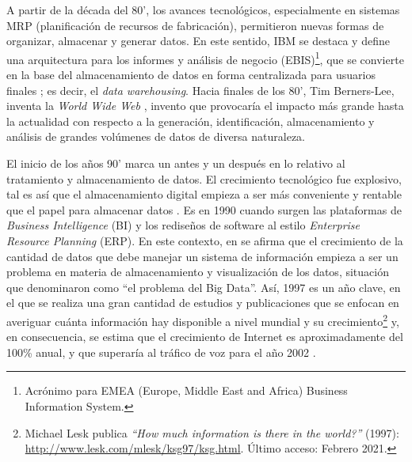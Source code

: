 \bigskip A partir de la década del 80’, los avances tecnológicos, especialmente en sistemas MRP (planificación de recursos de fabricación), permitieron nuevas formas de organizar, almacenar y generar datos. En este sentido, IBM se destaca y define una arquitectura para los informes y análisis de negocio (EBIS)\footnote{Acrónimo para EMEA (Europe, Middle East and Africa) Business Information System.}, que se convierte en la base del almacenamiento de datos en forma centralizada para usuarios finales \citep{devlin1988architecture}; es decir, el \textit{data warehousing}. Hacia finales de los 80’, Tim Berners-Lee, inventa la \textit{World Wide Web} \citep{berners1992world}, invento que provocaría el impacto más grande hasta la actualidad con respecto a la generación, identificación, almacenamiento y análisis de grandes volúmenes de datos de diversa naturaleza.

\bigskip El inicio de los años 90’ marca un antes y un después en lo relativo al tratamiento y almacenamiento de datos. El crecimiento tecnológico fue explosivo, tal es así que el almacenamiento digital empieza a ser más conveniente y rentable que el papel para almacenar datos \citep{morris2003evolution}. Es en 1990 cuando surgen las plataformas de \textit{Business Intelligence} (BI) y los rediseños de software al estilo \textit{Enterprise Resource Planning} (ERP). En este contexto, en \citep{cox1997application} se afirma que el crecimiento de la cantidad de datos que debe manejar un sistema de información empieza a ser un problema en materia de almacenamiento y visualización de los datos, situación que denominaron como “el problema del Big Data”. Así, 1997 es un año clave, en el que se realiza una gran cantidad de estudios y publicaciones que se enfocan en averiguar cuánta información hay disponible a nivel mundial y su crecimiento\footnote{Michael Lesk publica \textit{“How much information is there in the world?”} (1997): \url{http://www.lesk.com/mlesk/ksg97/ksg.html}. Último acceso: Febrero 2021.} y, en consecuencia, se estima que el crecimiento de Internet es aproximadamente del 100\% anual, y que superaría al tráfico de voz para el año 2002 \citep{coffman1998size}.

